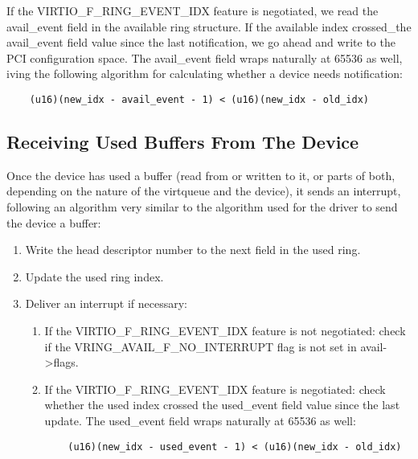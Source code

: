 If the VIRTIO_F_RING_EVENT_IDX feature is negotiated, we read the
avail_event field in the available ring structure. If the
available index crossed_the avail_event field value since the
last notification, we go ahead and write to the PCI configuration
space.  The avail_event field wraps naturally at 65536 as well,
iving the following algorithm for calculating whether a device needs
notification:

\begin{lstlisting}
	(u16)(new_idx - avail_event - 1) < (u16)(new_idx - old_idx)
\end{lstlisting}

\subsection{Receiving Used Buffers From The Device}\label{sec:General Initialization And Device Operation / Device Operation / Receiving Used Buffers From The Device}

Once the device has used a buffer (read from or written to it, or
parts of both, depending on the nature of the virtqueue and the
device), it sends an interrupt, following an algorithm very
similar to the algorithm used for the driver to send the device a
buffer:

\begin{enumerate}
\item Write the head descriptor number to the next field in the used
  ring.

\item Update the used ring index.

\item Deliver an interrupt if necessary:

  \begin{enumerate}
  \item If the VIRTIO_F_RING_EVENT_IDX feature is not negotiated:
    check if the VRING_AVAIL_F_NO_INTERRUPT flag is not set in
    avail->flags.

  \item If the VIRTIO_F_RING_EVENT_IDX feature is negotiated: check
    whether the used index crossed the used_event field value
    since the last update. The used_event field wraps naturally
    at 65536 as well:
\begin{lstlisting}
	(u16)(new_idx - used_event - 1) < (u16)(new_idx - old_idx)
\end{lstlisting}
  \end{enumerate}
\end{enumerate}

